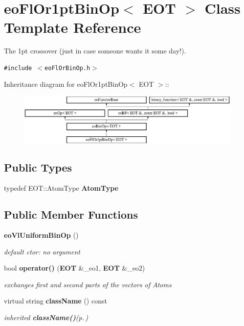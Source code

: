 \section{eo\-Fl\-Or1pt\-Bin\-Op$<$ EOT $>$ Class Template Reference}
\label{classeo_fl_or1pt_bin_op}
The 1pt crossover (just in case someone wants it some day!).  


{\tt \#include $<$eo\-Fl\-Or\-Bin\-Op.h$>$}

Inheritance diagram for eo\-Fl\-Or1pt\-Bin\-Op$<$ EOT $>$::\begin{figure}[H]
\begin{center}
\leavevmode
\includegraphics[height=2.60163cm]{classeo_fl_or1pt_bin_op}
\end{center}
\end{figure}
\subsection*{Public Types}
\begin{CompactItemize}
\item 
typedef EOT::Atom\-Type {\bf Atom\-Type}\label{classeo_fl_or1pt_bin_op_w0}

\end{CompactItemize}
\subsection*{Public Member Functions}
\begin{CompactItemize}
\item 
{\bf eo\-Vl\-Uniform\-Bin\-Op} ()\label{classeo_fl_or1pt_bin_op_a0}

\begin{CompactList}\small\item\em default ctor: no argument \item\end{CompactList}\item 
bool {\bf operator()} ({\bf EOT} \&\_\-eo1, {\bf EOT} \&\_\-eo2)\label{classeo_fl_or1pt_bin_op_a1}

\begin{CompactList}\small\item\em exchanges first and second parts of the vectors of Atoms \item\end{CompactList}\item 
virtual string {\bf class\-Name} () const \label{classeo_fl_or1pt_bin_op_a2}

\begin{CompactList}\small\item\em inherited {\bf class\-Name()}{\rm (p.\,\pageref{classeo_fl_or1pt_bin_op_a2})} \item\end{CompactList}\end{CompactItemize}


